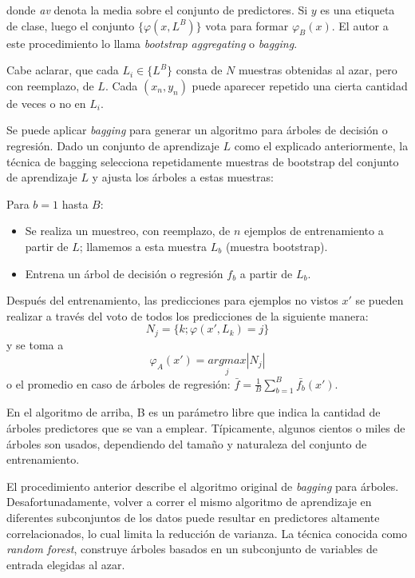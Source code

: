 	donde \textit{av} denota la media sobre el conjunto de predictores. Si $y$ es una etiqueta de clase, luego el conjunto  $\{ \varphi(x, L^{B}) \}$ vota para formar $\varphi_B(x)$. El autor a este procedimiento lo llama  \textit{bootstrap aggregating} o \textit{bagging}.

	Cabe aclarar, que cada $L_i \in \{ L^{B} \}$ consta de $N$ muestras obtenidas al azar, pero con reemplazo, de $L$. Cada $(x_n, y_n)$ puede aparecer repetido una cierta cantidad de veces o no en $L_i$.

	Se puede aplicar \textit{bagging} para generar un algoritmo para árboles de decisión o regresión. Dado un conjunto de aprendizaje $L$ como el explicado anteriormente, la técnica de bagging selecciona repetidamente muestras de bootstrap del conjunto de aprendizaje $L$ y ajusta los árboles a estas muestras:

	Para $b=1$ hasta $B$:
	\begin{itemize}
		\item Se realiza un muestreo, con reemplazo, de $n$ ejemplos de entrenamiento a partir de $L$; llamemos a esta muestra $L_b$ (muestra bootstrap).
		\item Entrena un árbol de decisión o regresión $f_b$ a partir de $L_b$.
	\end{itemize}

	Después del entrenamiento, las predicciones para ejemplos no vistos $x'$ se pueden realizar a través del voto de todos los predicciones de la siguiente manera:
	$$N_j = \{ k;\varphi(x', L_k) = j \}$$
	y se toma a
	$$\varphi_A(x') = \underset{j}{argmax}|N_j|$$
	o el promedio en caso de árboles de regresión: $\bar{f} = \frac{1}{B}\sum_{b=1}^B\bar{f_b}(x')$.

	En el algoritmo de arriba, B es un parámetro libre que indica la cantidad de árboles predictores que se van a emplear. Típicamente, algunos cientos o miles de árboles son usados, dependiendo del tamaño y naturaleza del conjunto de entrenamiento.

	El procedimiento anterior describe el algoritmo original de \textit{bagging} para árboles. Desafortunadamente, volver a correr el mismo algoritmo de aprendizaje en diferentes subconjuntos de los datos puede resultar en predictores altamente correlacionados, lo cual limita la reducción de varianza. La técnica conocida como \textit{random forest}, construye árboles basados en un subconjunto de variables de entrada elegidas al azar.

